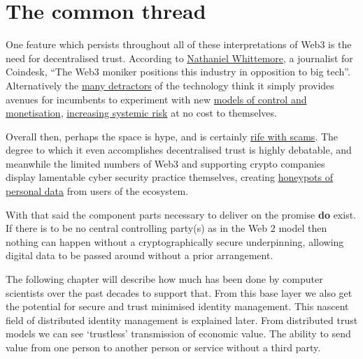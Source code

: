 \section{The common thread}
One feature which persists throughout all of these interpretations of Web3 is the need for decentralised trust. According to \href{https://www.coindesk.com/podcasts/the-breakdown-with-nlw/yesterdays-hearing-was-cryptos-most-positive-interaction-with-the-us-government-ever/}{Nathaniel Whittemore}, a journalist for Coindesk, ``The Web3 moniker positions this industry in opposition to big tech''. Alternatively the \href{https://cryptocriticscorner.com/}{many detractors} of the technology think it simply provides avenues for incumbents to experiment with new \href{https://www.cigionline.org/articles/amid-the-hype-over-web3-informed-skepticism-is-critical/}{models of control and monetisation}, \href{https://newsletters.theatlantic.com/galaxy-brain/624cb2ebdc551a00208c1524/crypto-bubble-web3-decentralized-finance/}{increasing systemic risk} at no cost to themselves.\par %
Overall then, perhaps the space is hype, and is certainly \href{https://web3isgoinggreat.com/}{rife with scams}. The degree to which it even accomplishes decentralised trust is highly debatable, and meanwhile the limited numbers of Web3 and supporting crypto companies display lamentable cyber security practice themselves, creating \href{https://www.coindesk.com/tag/data-breaches/}{honeypots of personal data} from users of the ecosystem.\par
With that said the component parts necessary to deliver on the promise \textbf{do} exist. If there is to be no central controlling party(s) as in the Web 2 model then nothing can happen without a cryptographically secure underpinning, allowing digital data to be passed around without a prior arrangement.\par%
The following chapter will describe how much has been done by computer scientists over the past decades to support that. From this base layer we also get the potential for secure and trust minimised identity management. This nascent field of distributed identity management is explained later. From distributed trust models we can see `trustless' transmission of economic value. The ability to send value from one person to another person or service without a third party. \par
